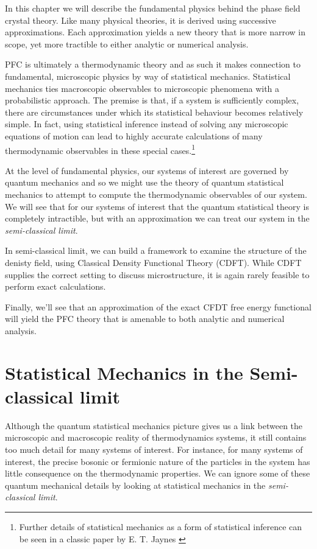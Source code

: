 In this chapter we will describe the fundamental physics behind the phase field crystal theory.
Like many physical theories, it is derived using successive approximations.
Each approximation yields a new theory that is more narrow in scope, yet more tractible to either analytic or numerical analysis.

PFC is ultimately a thermodynamic theory and as such it makes connection to fundamental, microscopic physics by way of statistical mechanics.
Statistical mechanics ties macroscopic observables to microscopic phenomena with a probabilistic approach.
The premise is that, if a system is sufficiently complex, there are circumstances under which its statistical behaviour becomes relatively simple.
In fact, using statistical inference instead of solving any microscopic equations of motion can lead to highly accurate calculations of many thermodynamic observables in these special cases.\footnote{Further details of statistical mechanics as a form of statistical inference can be seen in a classic paper by E. T. Jaynes \cite{JAYNES57}}

At the level of fundamental physics, our systems of interest are governed by quantum mechanics and so we might use the theory of quantum statistical mechanics to attempt to compute the thermodynamic observables of our system.
We will see that for our systems of interest that the quantum statistical theory is completely intractible, but with an approximation we can treat our system in the \textit{semi-classical limit}.

In semi-classical limit, we can build a framework to examine the structure of the denisty field, using Classical Density Functional Theory (CDFT).
While CDFT supplies the correct setting to discuss microstructure, it is again rarely feasible to perform exact calculations.

Finally, we'll see that an approximation of the exact CFDT free energy functional will yield the PFC theory that is amenable to both analytic and numerical analysis.

\section{Statistical Mechanics in the Semi-classical limit} %

Although the quantum statistical mechanics picture gives us a link between the microscopic and macroscopic reality of thermodynamics systems, it still contains too much detail for many systems of interest.
For instance, for many systems of interest, the precise bosonic or fermionic nature of the particles in the system has little consequence on the thermodynamic properties.
We can ignore some of these quantum mechanical details by looking at statistical mechanics in the \textit{semi-classical limit}.

